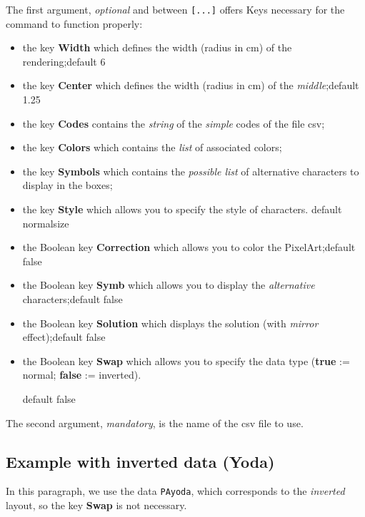\documentclass{article}
\newcommand\Cle[1]{{\bfseries\sffamily\textlangle #1\textrangle}}
\begin{document}
The first argument, \textit{optional} and between \texttt{[...]} offers \textsf{Keys} necessary for the command to function properly:

\begin{itemize}
	\item the key \Cle{Width} which defines the width (radius in cm) of the rendering;\hfill{}default \textsf{6}
	\item the key \Cle{Center} which defines the width (radius in cm) of the \textit{middle};\hfill{}default \textsf{1.25}
	\item the key \Cle{Codes} contains the \textit{string} of the \textit{simple} codes of the file \textsf{csv};
	\item the key \Cle{Colors} which contains the \textit{list} of associated colors;
	\item the key \Cle{Symbols} which contains the \textit{possible list} of alternative characters to display in the boxes;
	\item the key \Cle{Style} which allows you to specify the style of characters. \hfill{}default \textsf{normalsize}
	\item the Boolean key \Cle{Correction} which allows you to color the PixelArt;\hfill{}default \textsf{false}
	\item the Boolean key \Cle{Symb} which allows you to display the \textit{alternative} characters;\hfill{}default \textsf{false}
	\item the Boolean key \Cle{Solution} which displays the solution (with \textit{mirror} effect);\hfill{}default \textsf{false}
	\item the Boolean key \Cle{Swap} which allows you to specify the data type (\Cle{true} := normal; \Cle{false} := inverted).
	
	\hfill{}default \textsf{false}
\end{itemize}

The second argument, \textit{mandatory}, is the name of the \textsf{csv} file to use.

\pagebreak

\subsection{Example with inverted data (Yoda)}

In this paragraph, we use the data \texttt{PAyoda}, which corresponds to the \textit{inverted} layout, so the key \Cle{Swap} is not necessary.

\begin{PresentationCode}{}

\end{PresentationCode}
\end{document}

